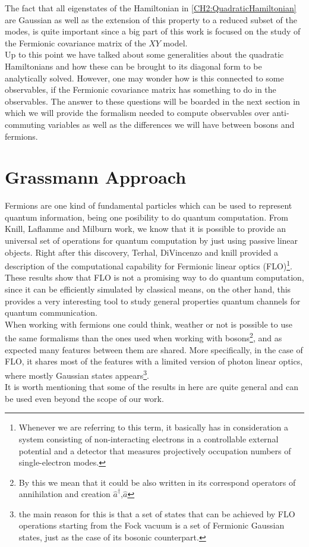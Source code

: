 \newline 
The fact that all eigenstates of the Hamiltonian in \eqref{CH2:QuadraticHamiltonian} are Gaussian as well as the extension of this property to a reduced subset of the modes, is quite important since a big part of this work is focused on the study of the Fermionic covariance matrix of the $XY$ model.\\
Up to this point we have talked about some generalities about the quadratic Hamiltonians and how these can be brought to its diagonal form to be analytically solved. However, one may wonder how is this connected to some observables, if the Fermionic covariance matrix has something to do in the observables. The answer to these questions will be boarded in the next section in which we will provide the formalism needed to compute observables over anti-commuting variables as well as the differences we will have between bosons and fermions.
\section{Grassmann Approach}
Fermions are one kind of fundamental particles which can be used to represent quantum information, being one posibility to do quantum computation. From Knill, Laflamme and Milburn\cite{knill_scheme_2001} work, we know that it is possible to provide an universal set of operations for quantum computation by just using passive linear objects. Right after this discovery, Terhal, DiVincenzo\cite{terhal_classical_2002} and knill\cite{knill_fermionic_2001} provided a description of the computational capability for Fermionic linear optics (FLO)\footnote{Whenever we are referring to this term, it basically has in consideration a system consisting of non-interacting electrons in a controllable external potential and a detector that measures projectively occupation numbers of single-electron modes.}. These results show that FLO is not a promising way to do quantum computation, since it can be efficiently simulated by classical means, on the other hand, this provides a very interesting tool to study general properties quantum channels for quantum communication.\\
When working with fermions one could think, weather or not is possible to use the same formalisms than the ones used when working with bosons\footnote{By this we mean that it could be also written in its correspond operators of annihilation and creation $\hat{a}^{\dagger}$,$\hat{a}$\cite{noauthor_density_2007}}, and as expected many features between them are shared. More specifically, in the case of FLO, it shares most of the features with a limited version of photon linear optics, where mostly Gaussian states appears\cite{knill_scheme_2001}\footnote{the main reason for this is that a set of states that can be achieved by FLO operations starting from the Fock vacuum is a set of Fermionic Gaussian states, just as the case of its bosonic counterpart.}.\\
It is worth mentioning that some of the results in here are quite general and can be used even beyond the scope of our work.

